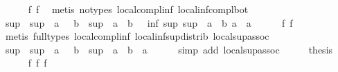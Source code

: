 \begin{isabellebody}
\ \ \ \ \isamarkupfalse%
\ f{}{}\ f{}{}\ \isamarkupfalse%
\ {\isacharparenleft}metis\ {\isacharparenleft}no{\isacharunderscore}types{\isacharparenright}\ local{\isachardot}compl{\isacharunderscore}inf\ local{\isachardot}inf{\isacharunderscore}compl{\isacharunderscore}bot{\isacharparenright}\isanewline
\ \ \isamarkupfalse%
\ \isamarkupfalse%
\ {\isachardoublequoteopen}sup\ {\isacharparenleft}{\isacharminus}\ sup\ {\isacharparenleft}{\isacharminus}\ a{\isacharparenright}\ {\isacharparenleft}{\isacharminus}\ {\isacharparenleft}{\isacharminus}\ b{\isacharparenright}{\isacharparenright}{\isacharparenright}\ {\isacharparenleft}{\isacharminus}\ sup\ {\isacharparenleft}{\isacharminus}\ a{\isacharparenright}\ {\isacharparenleft}{\isacharminus}\ b{\isacharparenright}{\isacharparenright}\ {\isacharequal}\ {\isacharminus}\ inf\ {\isacharparenleft}sup\ {\isacharparenleft}sup\ {\isacharparenleft}{\isacharminus}\ a{\isacharparenright}\ {\isacharparenleft}{\isacharminus}\ b{\isacharparenright}{\isacharparenright}\ a{\isacharparenright}\ {\isacharparenleft}{\isacharminus}\ a{\isacharparenright}{\isachardoublequoteclose}\isanewline
\ \ \ \ \isamarkupfalse%
\ f{}{}\ f{}{}\ \isamarkupfalse%
\ {\isacharparenleft}metis\ {\isacharparenleft}full{\isacharunderscore}types{\isacharparenright}\ local{\isachardot}compl{\isacharunderscore}inf\ local{\isachardot}inf{\isacharunderscore}sup{\isacharunderscore}distrib{}\ local{\isachardot}sup{\isacharunderscore}assoc{\isacharparenright}\isanewline
\ \ \isamarkupfalse%
\ \isamarkupfalse%
\ {\isachardoublequoteopen}sup\ {\isacharparenleft}{\isacharminus}\ sup\ {\isacharparenleft}{\isacharminus}\ a{\isacharparenright}\ {\isacharparenleft}{\isacharminus}\ {\isacharparenleft}{\isacharminus}\ b{\isacharparenright}{\isacharparenright}{\isacharparenright}\ {\isacharparenleft}{\isacharminus}\ sup\ {\isacharparenleft}{\isacharminus}\ a{\isacharparenright}\ {\isacharparenleft}{\isacharminus}\ b{\isacharparenright}{\isacharparenright}\ {\isacharequal}\ a{\isachardoublequoteclose}\isanewline
\ \ \ \ \isamarkupfalse%
\ {\isacharparenleft}simp\ add{\isacharcolon}\ local{\isachardot}sup{\isacharunderscore}assoc{\isacharparenright}\isanewline
\ \ \isamarkupfalse%
\ \isamarkupfalse%
\ {\isacharquery}thesis\isanewline
\ \ \ \ \isamarkupfalse%
\ f{}{}\ f{}{}\ f{}{}\ \isamarkupfalse%

\end{isabellebody}
